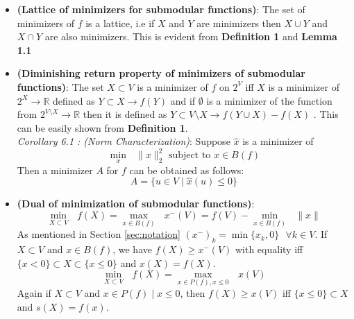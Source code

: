 \begin{itemize}
 \item {\bf \lemma (Lattice of minimizers for submodular functions)}: The set of minimizers of $f$ is a lattice, i.e if $X$ and $Y$ are minimizers then $X\cup Y$ and $X \cap Y$ are also minimizers. This is evident from {\bf Definition 1} and {\bf Lemma 1.1}\\

 \item {\bf \lemma (Diminishing return property of minimizers of submodular functions)}: The set $X \subset V$ is a minimizer of $f$ on $2^V$ iff $X$ is a minimizer of $2^X \rightarrow \mathds{R}$ defined as $Y \subset X \rightarrow f(Y)$ and if $\emptyset$ is a minimizer of the function from $2^{V\setminus X} \rightarrow \mathds{R}$  then it is defined as $Y \subset V\setminus X \rightarrow f(Y \cup X) - f(X)$ . This can be easily shown from {\bf Definition 1}.\\
 
  {\it Corollary 6.1 : (Norm Characterization)}: Suppose $\hat{x}$ is a minimizer of 
 \[
  \underset{x}{\operatorname{min }}\text{ } \| x\|_2^2 \text{ subject to } x\in B(f)
 \]
 Then a minimizer $A$ for $f$ can be obtained as follows:
 \[
   A = \{ u \in V \mid \hat{x}(u) \leq 0\}
 \]

  \item{\bf \lemma (Dual of minimization of submodular functions)}: \[ \underset{X \subset V}{\operatorname{min }}\text{ } f(X) =  \underset{x \in B(f) }{\operatorname{max }}\text{ } x^-(V) = f(V) - \underset{x \in B(f) }{\operatorname{min }}\text{ } \|x\| \]
  As mentioned in Section \ref{sec:notation} $(x^-)_k = \min\{x_k,0\} \text{ } \forall k \in V$. If $X \subset V$ and $x \in B(f)$, we have $f(X) \geq x^-(V)$ with equality iff $\{ x < 0 \} \subset X \subset \{ x\leq 0\}$ and $x(X) = f(X)$. \\
  \[
   \underset{X \subset V}{\operatorname{min }}\text{ } f(X) =  \underset{x \in P(f), x\leq 0 }{\operatorname{max }}\text{ } x(V)
  \]
  Again if $X\subset V$ and $x\in P(f) \mid x \leq 0$, then $f(X) \geq x(V)$ iff $\{x \leq 0 \} \subset X$ and $s(X) = f(x)$.\\

\end{itemize}
